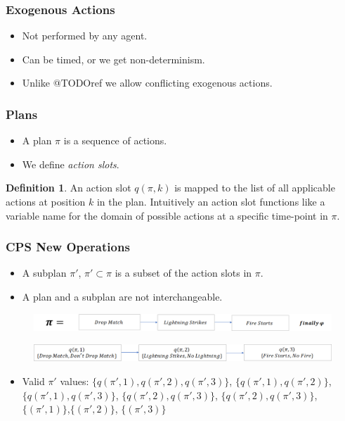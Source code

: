 \documentclass{beamer}
\theoremstyle{plain}
\theoremstyle{definition}
\newtheorem{defn}[thm]{Definition} %
\begin{document}
\begin{frame}
\frametitle{Exogenous Actions}
\begin{itemize}
\item Not performed by any agent.
\item Can be timed, or we get non-determinism.
\item Unlike @TODOref we allow conflicting exogenous actions.
\end{itemize}

\end{frame}


\begin{frame}
\frametitle{Plans}
\begin{itemize}
\item A plan $\pi$ is a sequence of actions. 

\item We define \textit{action slots}. 

\end{itemize}


\begin{defn}
An action slot $q(\pi,k)$ is mapped to the list of all applicable actions at position $k$ in the plan. Intuitively an action slot functions like a variable name for the domain of possible actions at a specific time-point in $\pi$.
\end{defn}

\end{frame}


\begin{frame}
\frametitle{CPS New Operations}
\begin{itemize}
\item A subplan $\pi'$, $\pi'\subset \pi$ is a subset of the action slots in $\pi$.
\item A plan and a subplan are not interchangeable.
\end{itemize}

\begin{figure}
\includegraphics[scale=.30]{bobPlanOriginal}
\end{figure}
\begin{figure}
\includegraphics[scale=.35]{bobPlan}
\end{figure}

\begin{itemize}
\item Valid $\pi'$ values: $\{q(\pi',1),q(\pi',2),q(\pi',3)\}$, $\{q(\pi',1),q(\pi',2)\}$, $\{q(\pi',1),q(\pi',3)\}$, $\{q(\pi',2),q(\pi',3)\}$, $\{q(\pi',2),q(\pi',3)\}$, $\{(\pi',1)\}$,$\{(\pi',2)\}$, $\{(\pi',3)\}$
\end{itemize}

\end{frame}
\end{document}
